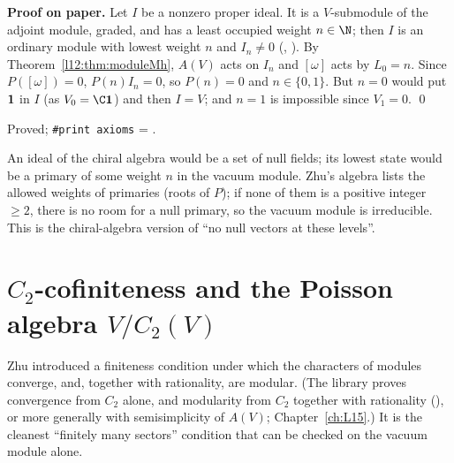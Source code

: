 \textbf{Proof on paper.} Let $I$ be a nonzero proper ideal. It is a $V$-submodule of the adjoint module, graded,
and has a least occupied weight $n\in\N$; then $I$ is an ordinary module with lowest weight $n$ and $I_n\neq0$
(, ). By Theorem~\ref{l12:thm:moduleMh}, $A(V)$ acts on $I_n$ and
$[\omega]$ acts by $L_0 = n$. Since $P([\omega]) = 0$, $P(n)I_n = 0$, so $P(n) = 0$ and $n\in\{0,1\}$. But $n=0$ would
put $\mathbf{1}$ in $I$ (as $V_0 = \C\ltwelvevac$) and then $I = V$; and $n = 1$ is impossible since $V_1=0$. \qed

\begin{status}
Proved; \texttt{\#print axioms} = .
\end{status}

\begin{physics}
An ideal of the chiral algebra would be a set of null fields; its lowest state would be a primary of some weight
$n$ in the vacuum module. Zhu's algebra lists the allowed weights of primaries (roots of $P$); if none of them is a
positive integer $\ge2$, there is no room for a null primary, so the vacuum module is irreducible. This is the
chiral-algebra version of ``no null vectors at these levels''.
\end{physics}

\section{\texorpdfstring{$C_2$}{C2}-cofiniteness and the Poisson algebra \texorpdfstring{$V/C_2(V)$}{V/C2(V)}}\label{l12:sec:c2}

Zhu introduced a finiteness condition under which the characters of modules converge, and, together with rationality,
are modular. (The library proves convergence from $C_2$ alone, and modularity from $C_2$ together with rationality
(), or more generally with semisimplicity of $A(V)$; Chapter~\ref{ch:L15}.) It is the cleanest ``finitely many sectors'' condition that can be checked on the vacuum
module alone.


